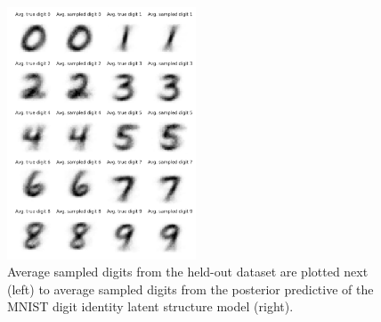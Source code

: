 \begin{figure}[h!]
    \centering
    \includegraphics[width=0.5\textwidth]{images/bda_checks/mnist/BDA_model_sample_check.png}
    \caption{Average sampled digits from the held-out dataset are plotted next (left) to average sampled digits from the posterior predictive of the MNIST digit identity latent structure model (right).}
    \label{fig:bda_check_mnist_sample_plot}
\end{figure}

